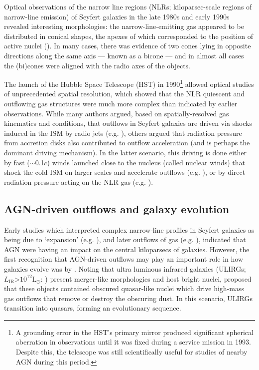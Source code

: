 Optical observations of the narrow line regions (NLRs; kiloparsec-scale regions of narrow-line emission) of Seyfert galaxies in the late 1980s and early 1990s revealed interesting morphologies: the narrow-line-emitting gas appeared to be distributed in conical shapes, the apexes of which corresponded to the position of active nuclei (\citealt{Pogge1988, Pogge1989, Pogge1990, Tadhunter1989, Cecil1990, Miller1990, Evans1991}). In many cases, there was evidence of two cones lying in opposite directions along the same axis --- known as a bicone --- and in almost all cases the (bi)cones were aligned with the radio axes of the objects.

The launch of the Hubble Space Telescope (HST) in 1990\footnote{A grounding error in the HST's primary mirror produced significant spherical aberration in observations until it was fixed during a service mission in 1993. Despite this, the telescope was still scientifically useful for studies of nearby AGN during this period.} allowed optical studies of unprecedented spatial resolution, which showed that the NLR quiescent and outflowing gas structures were much more complex than indicated by earlier observations. While many authors argued, based on spatially-resolved gas kinematics and conditions, that outflows in Seyfert galaxies are driven via shocks induced in the ISM by radio jets (e.g. \citealt{Taylor1992, Bower1995, Capetti1995a, Capetti1995b, Axon1998}), others argued that radiation pressure from accretion disks also contributed to outflow acceleration (and is perhaps the dominant driving mechanism). In the latter scenario, this driving is done either by fast ($\sim$0.1\;$c$) winds launched close to the nucleus (called nuclear winds) that shock the cold ISM on larger scales and accelerate outflows (e.g. \citealt{Cecil1990}), or by direct radiation pressure acting on the NLR gas (e.g. \citealt{Crenshaw2000_N1068, Crenshaw2000_N4151, Kaiser2000}).

\subsection{AGN-driven outflows and galaxy evolution}
\label{section: introduction: historical_context: galaxy evolution}

Early studies which interpreted complex narrow-line profiles in Seyfert galaxies as being due to `expansion' (e.g. \citealt{Walker1968, Anderson1970, Glaspey1976}), and later outflows of gas (e.g. \citealt{Grandi1977, Heckman1981}), indicated that AGN were having an impact on the central kiloparsecs of galaxies. However, the first recognition that AGN-driven outflows may play an important role in how galaxies evolve was by \citet{Sanders1988}. Noting that ultra luminous infrared galaxies (ULIRGs; $L_\mathrm{IR}$\;\textgreater\;$10^{12}$\;L$_\mathrm{\odot}$: \citealt{Sanders1988, Sanders1996}) present merger-like morphologies and host bright nuclei, \citet{Sanders1988} proposed that these objects contained obscured quasar-like nuclei which drive high-mass gas outflows that remove or destroy the obscuring dust. In this scenario, ULIRGs transition into quasars, forming an evolutionary sequence.


